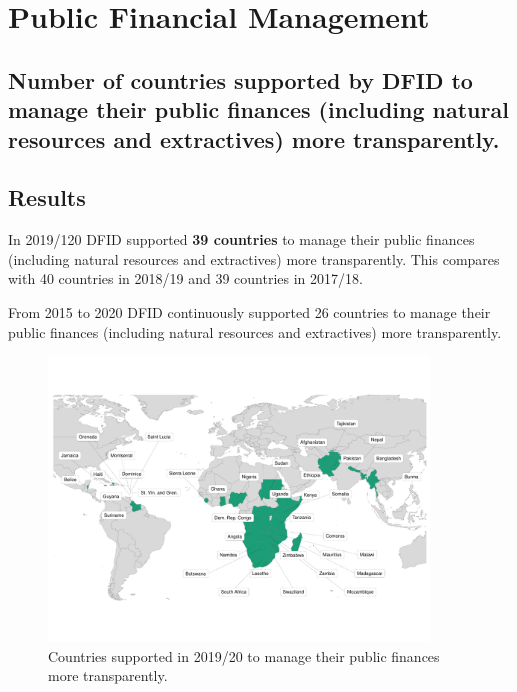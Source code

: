 \chapter{Public Financial Management}

\section*{Number of countries supported by DFID to manage their public finances (including natural resources and extractives) more transparently.}
\thispagestyle{empty}



\section{Results}

In 2019/120 DFID supported \textbf{39 countries} to manage their public finances (including natural resources and extractives) more transparently. %
This compares with 40 countries in 2018/19 and 39 countries in 2017/18. %

From 2015 to 2020 DFID continuously supported 26 countries to manage their public finances (including natural resources and extractives) more transparently.
%

\begin{figure}[htbp]
  \centering
\begin{knitrout}
\color{fgcolor}
\includegraphics[width=0.9\textwidth]{figs/pfm_plot-1} 

\end{knitrout}
  \caption{Countries supported in 2019/20 to manage their public finances more transparently.}
  \label{fig:pfm_plot}
\end{figure}


